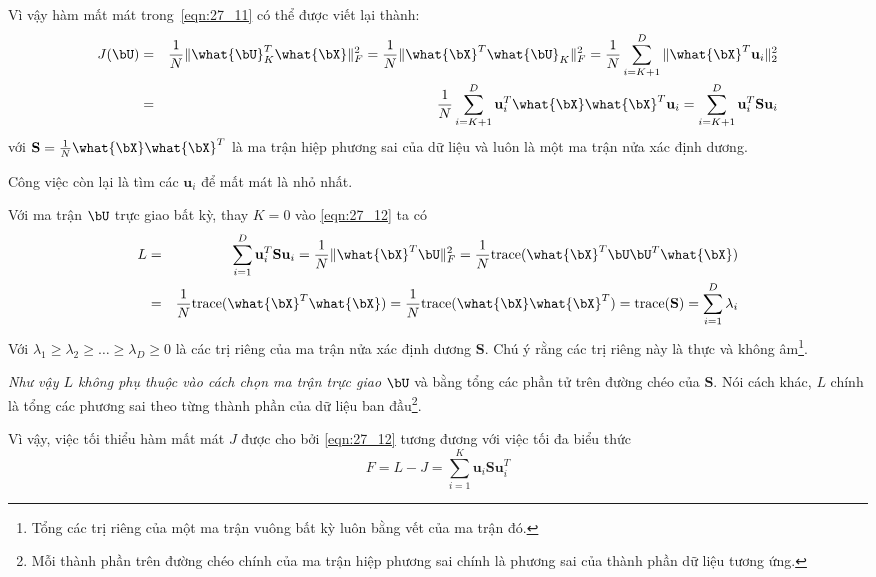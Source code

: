 
Vì vậy hàm mất mát trong~\eqref{eqn:27_11} có thể được viết lại thành:
\begin{eqnarray}
    J(\bU) &=&  \frac{1}{N} \|\what{\bU}_K^T\what{\bX} \|_F^2 = \frac{1}{N}
    \|\what{\bX}^T \what{\bU}_K \|_F^2 =
    \frac{1}{N}\sum_{i = K+1}^D \|\what{\bX}^T\mathbf{u}_i \|_2^2 \\\
    \label{eqn:27_12}
    &=& \frac{1}{N} \sum_{i=K+1}^D \mathbf{u}_i^T\what{\bX}\what{\bX}^T \mathbf{u}_i
    = \sum_{i=K+1}^D \mathbf{u}_i^T\mathbf{S} \mathbf{u}_i
\end{eqnarray}
với $\mathbf{S} = \frac{1}{N}\what{\bX}\what{\bX}^T$ là ma trận hiệp phương sai
của dữ liệu và luôn là một ma trận nửa xác định dương.

Công việc còn lại là tìm các $\mathbf{u}_i$ để mất mát là nhỏ nhất.

Với ma trận $\bU$ trực giao bất kỳ, thay $K = 0$ vào \eqref{eqn:27_12} ta có
\begin{eqnarray}
    L &=& \sum_{i=1}^D \mathbf{u}_i^T\mathbf{Su}_i = \frac{1}{N} \|\what{\bX}^T\bU\|_F^2 =\frac{1}{N} \text{trace}(\what{\bX}^T\bU \bU^T \what{\bX})  \\\
    \label{eqn:27_13}
    &=& \frac{1}{N} \text{trace} (\what{\bX}^T \what{\bX})  = \frac{1}{N} \text{trace} (\what{\bX} \what{\bX}^T) =\text{trace} (\mathbf{S}) = \sum_{i=1}^D \lambda_i
\end{eqnarray}
Với $\lambda_1 \geq \lambda_2 \geq \dots \geq \lambda_D \geq 0$ là các trị riêng
của ma trận nửa xác định dương $\mathbf{S}$. Chú ý rằng các trị riêng này là
thực và không âm\footnote{Tổng các trị riêng của một ma trận vuông bất kỳ luôn
    bằng vết của ma trận đó.}.


\textit{Như vậy $L$ không phụ thuộc vào cách chọn ma trận trực giao $\bU$} và
bằng tổng các phần tử trên đường chéo của $\mathbf{S}$. Nói cách khác, $L$ chính
là tổng các phương sai theo từng thành phần của dữ liệu ban
đầu\footnote{Mỗi thành phần trên đường chéo chính của ma trận hiệp phương sai
    chính là phương sai của thành phần dữ liệu tương ứng.}.

Vì vậy, việc tối thiểu hàm mất mát $J$ được cho bởi \eqref{eqn:27_12} tương
đương với việc tối đa biểu thức
\begin{equation}
    F  = L - J = \sum_{i=1}^K \mathbf{u}_i \mathbf{S} \mathbf{u}_i^T
\end{equation}
